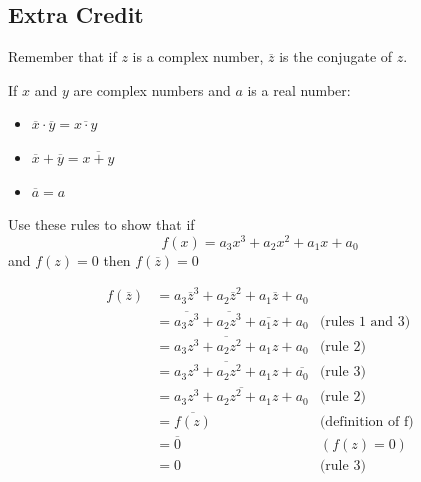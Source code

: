 \documentclass[fleqn,addpoints]{exam}
\begin{document}
\begin{questions}
\pagebreak

\section{Extra Credit}
\bonusquestion[10]

Remember that if $z$ is a complex number, $\overline{z}$ is the conjugate of $z$.

If $x$ and $y$ are complex numbers and $a$ is a real number:
\begin{itemize}
  \item $\overline{x} \cdot \overline{y} = \overline{x \cdot y}$
  \item $\overline{x} + \overline{y} = \overline{x + y}$
  \item $\overline{a} = a$
\end{itemize}

Use these rules to show that if
\[
  f(x) = a_3 x^3 + a_2 x^2 + a_1 x + a_0
\]
and $f(z) = 0$ then $f(\overline{z}) = 0$

\begin{solution}[2 cm]
\begin{align*}
  f(\overline{z}) &= a_3\overline{z}^3 + a_2\overline{z}^2 + a_1\overline{z} + a_0 & \\
     &= \overline{a_3 z^3} + \overline{a_2 z^3} + \overline{a_1 z} + a_0           & \text{(rules 1 and 3)} \\
     &= \overline{a_3z^3 + a_2z^2 + a_1z} + a_0                                    & \text{(rule 2)} \\
     &= \overline{a_3z^3 + a_2z^2 + a_1z} + \overline{a_0}                         & \text{(rule 3)} \\
     &= \overline{a_3z^3 + a_2z^2 + a_1z + a_0}                                    & \text{(rule 2)} \\
     &= \overline{f(z)}                                                           & \text{(definition of f)} \\
     &= \overline{0}                                                              & (f(z) = 0) \\
     &= 0                                                                         & \text{(rule 3)} \\
\end{align*}

\end{solution}

\end{questions}
\end{document}
